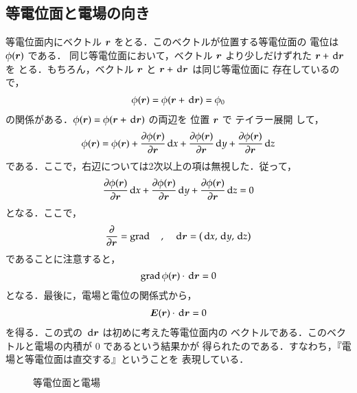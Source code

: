         \subsection{等電位面と電場の向き}\label{subsec:toudeni_denba}
            等電位面内にベクトル $\boldsymbol{r}$ をとる．このベクトルが位置する等電位面の
            電位は $\phi(\boldsymbol{r})$ である．
            同じ等電位面において，ベクトル $\boldsymbol{r}$ より少しだけずれた $\boldsymbol{r}+\,\mathrm{d}\boldsymbol{r}$ を
            とる．もちろん，ベクトル $\boldsymbol{r}$ と $\boldsymbol{r}+\,\mathrm{d}\boldsymbol{r}$ は同じ等電位面に
            存在しているので，
                \begin{align}
                    \phi(\boldsymbol{r})=\phi(\boldsymbol{r}+\,\mathrm{d}\boldsymbol{r})=\phi_{0}
                \end{align}
            の関係がある．$\phi(\boldsymbol{r})=\phi(\boldsymbol{r}+\,\mathrm{d}\boldsymbol{r})$ の両辺を
            位置 $\boldsymbol{r}$ で テイラー展開 して，
                \begin{align}
                    \phi(\boldsymbol{r})=\phi(\boldsymbol{r})
                    +\frac{\partial \phi(\boldsymbol{r})}{\partial \boldsymbol{r}}\,\mathrm{d} x
                    +\frac{\partial \phi(\boldsymbol{r})}{\partial \boldsymbol{r}}\,\mathrm{d} y
                    +\frac{\partial \phi(\boldsymbol{r})}{\partial \boldsymbol{r}}\,\mathrm{d} z
                \end{align}
            である．ここで，右辺については2次以上の項は無視した．従って，
                \begin{align}
                    \frac{\partial \phi(\boldsymbol{r})}{\partial \boldsymbol{r}}\,\mathrm{d} x
                    +\frac{\partial \phi(\boldsymbol{r})}{\partial \boldsymbol{r}}\,\mathrm{d} y
                    +\frac{\partial \phi(\boldsymbol{r})}{\partial \boldsymbol{r}}\,\mathrm{d} z=0
                \end{align}
            となる．ここで，
                \begin{align}
                    \frac{\partial}{\partial \boldsymbol{r}}=\mathrm{grad}\, \quad, \quad \,\mathrm{d}\boldsymbol{r}=\left( \,\mathrm{d} x,\,\mathrm{d} y,\,\mathrm{d} z \right)
                \end{align}
            であることに注意すると，
                \begin{align}
                    \mathrm{grad}\,\phi(\boldsymbol{r})\cdot \,\mathrm{d}\boldsymbol{r}=0
                \end{align}
            となる．最後に，電場と電位の関係式から，
                \begin{align}
                    \boldsymbol{E}(\boldsymbol{r})\cdot \,\mathrm{d}\boldsymbol{r}=0
                \end{align}
            を得る．この式の $\,\mathrm{d}\boldsymbol{r}$ は初めに考えた等電位面内の
            ベクトルである．このベクトルと電場の内積が 0 であるという結果かが
            得られたのである．すなわち，『電場と等電位面は直交する』ということを
            表現している．
                \begin{figure}[hbt]
                    \begin{center}
                        \caption{等電位面と電場}
                        \label{fig:DengaToToudenniMen001}
                    \end{center}
                \end{figure}


